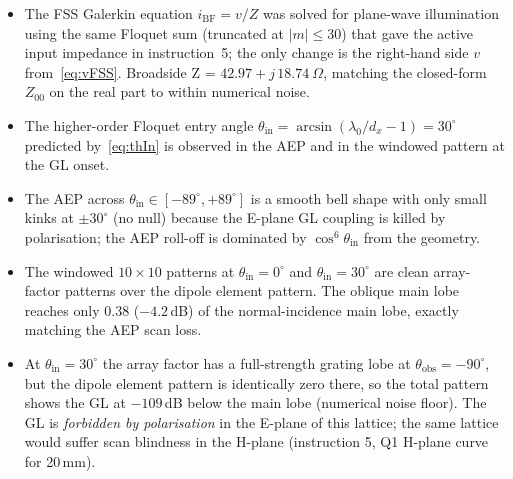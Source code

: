 \documentclass{article}
\begin{document}
\begin{itemize}
\item The FSS Galerkin equation $i_{\text{BF}} = v/Z$ was solved for plane-wave illumination using the same Floquet sum (truncated at $|m| \leq 30$) that gave the active input impedance in instruction~5; the only change is the right-hand side $v$ from~\eqref{eq:vFSS}. Broadside Z = $42.97 + j\,\SI{18.74}{\Omega}$, matching the closed-form $Z_{00}$ on the real part to within numerical noise.
\item The higher-order Floquet entry angle $\theta_{\text{in}} = \arcsin(\lambda_0/d_x - 1) = 30^\circ$ predicted by~\eqref{eq:thIn} is observed in the AEP and in the windowed pattern at the GL onset.
\item The AEP across $\theta_{\text{in}} \in [-89^\circ,+89^\circ]$ is a smooth bell shape with only small kinks at $\pm 30^\circ$ (no null) because the E-plane GL coupling is killed by polarisation; the AEP roll-off is dominated by $\cos^6\theta_{\text{in}}$ from the geometry.
\item The windowed $10\times10$ patterns at $\theta_{\text{in}} = 0^\circ$ and $\theta_{\text{in}} = 30^\circ$ are clean array-factor patterns over the dipole element pattern. The oblique main lobe reaches only $0.38$ ($-4.2\,$dB) of the normal-incidence main lobe, exactly matching the AEP scan loss.
\item At $\theta_{\text{in}} = 30^\circ$ the array factor has a full-strength grating lobe at $\theta_{\text{obs}} = -90^\circ$, but the dipole element pattern is identically zero there, so the total pattern shows the GL at $-109\,$dB below the main lobe (numerical noise floor). The GL is \emph{forbidden by polarisation} in the E-plane of this lattice; the same lattice would suffer scan blindness in the H-plane (instruction 5, Q1 H-plane curve for 20\,mm).
\end{itemize}
\end{document}
